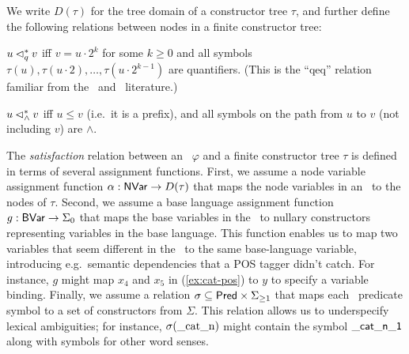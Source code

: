 We write $D(\tau)$ for the tree domain of a constructor tree $\tau$,
and further define the following relations between nodes in a finite
constructor tree:

\begin{definition}\label{defn:dominance}
$u \lhd^*_q v$ iff $v = u \cdot 2^k$ for some $k \geq 0$ and all
  symbols $\tau(u), \tau(u \cdot 2), \ldots, \tau(u \cdot 2^{k-1})$
  are quantifiers.  (This is the ``qeq'' relation familiar from the
  \mrs\ and \rmrs\ literature.)

  $u \lhd^*_\wedge v$ iff $u \leq v$ (i.e.\ it is a prefix), and all
  symbols on the path from $u$ to $v$ (not including $v$) are
  $\wedge$.
\end{definition}

The {\em satisfaction} relation between an \rmrs\ $\varphi$ and a
finite constructor tree $\tau$ is defined in terms of several
assignment functions.  First, we assume a node variable assignment
function $\alpha: \mathsf{NVar} \rightarrow D(\tau)$ that maps the node
variables in an \rmrs\ to the nodes of $\tau$.  Second, we assume a
base language assignment function $g:\mathsf{BVar} \rightarrow \Sigma_0$ that
maps the base variables in the \rmrs\ to nullary constructors
representing variables in the base language.  This function enables us
to map two variables that seem different in the \rmrs\ to the same
base-language variable, introducing e.g.\ semantic dependencies that a
POS tagger didn't catch.  For instance, $g$ might map $x_4$ and $x_5$
in (\ref{ex:cat-pos}) to $y$ to specify a variable binding.  Finally,
we assume a relation $\sigma \subseteq \mathsf{Pred} \times \Sigma_{\geq 1}$
that maps each \rmrs\ predicate symbol to a set of constructors from
$\Sigma$.  This relation allows us to underspecify lexical
ambiguities; for instance, $\sigma(\mathrm{\_cat\_n})$ might contain
the symbol $\mathsf{\_cat\_n\_1}$ along with symbols for other word
senses.

